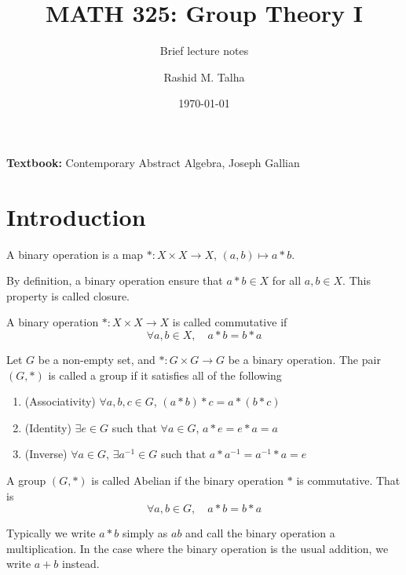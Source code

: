 \documentclass[11pt]{penrose}
\title{MATH 325: Group Theory I}
\subtitle{Brief lecture notes}
\author{Rashid M. Talha}
\affiliation{School of Natural Sciences, NUST}
\date{\today}
\begin{document}
\maketitle

\textbf{Textbook:} Contemporary Abstract Algebra, Joseph Gallian

\section{Introduction}
\begin{ndfn}
    A binary operation is a map $* : X \times X \to X$, $(a,b) \mapsto a * b$.
\end{ndfn}

By definition, a binary operation ensure that $a * b \in X$ for all $a, b \in X$. This property is called closure.

\begin{ndfn}
    A binary operation $* : X \times X \to X$ is called commutative if
    \begin{equation*}
        \forall a, b \in X, \quad a * b = b * a
    \end{equation*}
\end{ndfn}

\begin{ndfn}
    Let $G$ be a non-empty set, and $* : G \times G \to G$ be a binary operation. The pair $(G, *)$ is called a group if it satisfies all of the following
    \begin{enumerate}
        \item (Associativity) $\forall a, b, c \in G$, $(a * b) * c = a * (b * c)$
        \item (Identity) $\exists e \in G$ such that $\forall a \in G$, $a * e = e * a = a$
        \item (Inverse) $\forall a \in G$, $\exists a^{-1} \in G$ such that $a * a^{-1} = a^{-1} * a = e$
    \end{enumerate}
\end{ndfn}

\begin{ndfn}
    A group $(G, *)$ is called Abelian if the binary operation $*$ is commutative. That is
    \begin{equation*}
        \forall a, b \in G, \quad a * b = b * a
    \end{equation*}
\end{ndfn}

Typically we write $a * b$ simply as $ab$ and call the binary operation a multiplication. In the case where the binary operation is the usual addition, we write $a + b$ instead.
\end{document}
